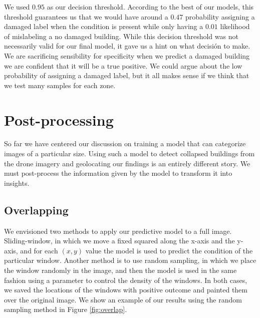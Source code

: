 We used $0.95$ as our decision threshold. According to the best of our models, this threshold guarantees us that we would have around a $0.47$ probability assigning a damaged label when the condition is present while only having a $0.01$ likelihood of mislabeling a no damaged building. While this decision threshold was not necessarily valid for our final model, it gave us a hint on what decisión to make. We are sacrificing sensibility for specificity when we predict a damaged building we are confident that it will be a true positive. We could argue about the low probability of assigning a damaged label, but it all makes sense if we think that we test many samples for each zone.\\


\section{Post-processing}

So far we have centered our discussion on training a model that can categorize images of a particular size. Using such a model to detect collapsed buildings from the drone imagery and geolocating our findings is an entirely different story. We must post-process the information given by the model to transform it into insights.\\

\subsection{Overlapping}

We envisioned two methods to apply our predictive model to a full image. Sliding-window, in which we move a fixed squared along the x-axis and the y-axis, and for each $(x,y)$ value the model is used to predict the condition of the particular window. Another method is to use random sampling, in which we place the window randomly in the image, and then the model is used in the same fashion using a parameter to control the density of the windows. In both cases, we saved the locations of the windows with positive outcome and painted them over the original image. We show an example of our results using the random sampling method in Figure \ref{fig:overlap}.\\

